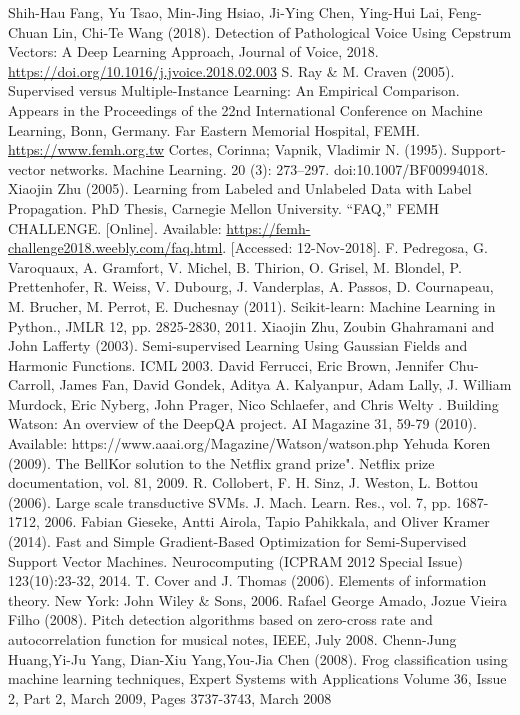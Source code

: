 \documentclass[conference]{IEEEtran}
\begin{document}
\begin{thebibliography}{00}
Shih-Hau Fang, Yu Tsao, Min-Jing Hsiao, Ji-Ying Chen, Ying-Hui Lai, Feng-Chuan Lin, Chi-Te Wang (2018).
Detection of Pathological Voice Using Cepstrum Vectors: A Deep Learning Approach,
Journal of Voice, 2018. \url{https://doi.org/10.1016/j.jvoice.2018.02.003}
S. Ray \& M. Craven (2005).
Supervised versus Multiple-Instance Learning: An Empirical Comparison.
Appears in the Proceedings of the 22nd International Conference on Machine Learning, Bonn, Germany.
Far Eastern Memorial Hospital, FEMH. \url{https://www.femh.org.tw}
Cortes, Corinna; Vapnik, Vladimir N. (1995). Support-vector networks. Machine Learning. 20 (3): 273–297. doi:10.1007/BF00994018.
Xiaojin Zhu (2005). Learning from Labeled and Unlabeled Data with Label Propagation. PhD Thesis, Carnegie Mellon University.
“FAQ,” FEMH CHALLENGE. [Online]. Available: \url{https://femh-challenge2018.weebly.com/faq.html}. [Accessed: 12-Nov-2018].
F. Pedregosa, G. Varoquaux, A. Gramfort, V. Michel, B. Thirion, O. Grisel, M. Blondel, P. Prettenhofer, R. Weiss, V. Dubourg, J. Vanderplas, A. Passos, D. Cournapeau, M. Brucher, M. Perrot, E. Duchesnay (2011). Scikit-learn: Machine Learning in Python., JMLR 12, pp. 2825-2830, 2011.
Xiaojin Zhu, Zoubin Ghahramani and John Lafferty (2003). Semi-supervised Learning Using Gaussian Fields and Harmonic Functions. ICML 2003.
David Ferrucci, Eric Brown, Jennifer Chu-Carroll, James Fan, David Gondek, Aditya A. Kalyanpur, Adam Lally, J. William Murdock, Eric Nyberg, John Prager, Nico Schlaefer, and Chris Welty . Building Watson: An overview of the DeepQA project. AI Magazine 31, 59-79 (2010). Available: https://www.aaai.org/Magazine/Watson/watson.php
Yehuda Koren (2009). The BellKor solution to the Netflix grand prize". Netflix prize documentation, vol. 81, 2009.
R. Collobert, F. H. Sinz, J. Weston, L. Bottou (2006). Large scale transductive SVMs. J. Mach. Learn. Res., vol. 7, pp. 1687-1712, 2006.
Fabian Gieseke, Antti Airola, Tapio Pahikkala, and Oliver Kramer (2014). Fast and Simple Gradient-Based Optimization for Semi-Supervised Support Vector Machines. Neurocomputing (ICPRAM 2012 Special Issue) 123(10):23-32, 2014. 
T. Cover and J. Thomas (2006). Elements of information theory. New York: John Wiley \& Sons, 2006.
Rafael George Amado, Jozue Vieira Filho (2008). Pitch detection algorithms based on zero-cross rate and autocorrelation function for musical notes, IEEE, July 2008.
Chenn-Jung Huang,Yi-Ju Yang, Dian-Xiu Yang,You-Jia Chen (2008). Frog classification using machine learning techniques, Expert Systems with Applications Volume 36, Issue 2, Part 2, March 2009, Pages 3737-3743, March 2008
\end{thebibliography}
\end{document}
